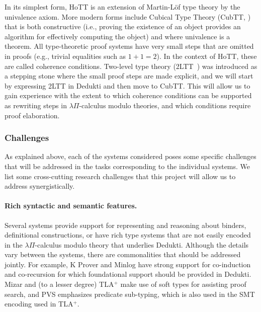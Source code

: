 In its simplest form, HoTT is an extension of Martin-L\"of type theory by the
univalence axiom. More modern forms include Cubical Type Theory (CubTT,
\cite{cohen:cubical}) that is both constructive (i.e., proving the existence of
an object provides an algorithm for effectively computing the object) and where
univalence is a theorem. All type-theoretic proof systems have very small steps
that are omitted in proofs (e.g., trivial equalities such as $1+1=2$). In the
context of HoTT, these are called coherence conditions. Two-level type theory
(2LTT~\cite{annenkov:two-level}) was introduced as a stepping stone where the
small proof steps are made explicit, and we will start by expressing 2LTT in
Dedukti and then move to CubTT. This will allow us to gain experience with
the extent to which coherence conditions can be supported as rewriting steps in
$\lambda\Pi$-calculus modulo theories, and which conditions require proof
elaboration.

\subsubsection*{Challenges}

As explained above, each of the systems considered poses some specific
challenges that will be addressed in the tasks corresponding to the
individual systems. We list some cross-cutting research challenges
that this project will allow us to address synergistically.

\paragraph*{Rich syntactic and semantic features.}
Several systems provide support for representing and reasoning about
binders, definitional constructions, or have rich type systems that
are not easily encoded in the $\lambda\Pi$-calculus modulo theory that
underlies Dedukti.  Although the details vary between the systems,
there are commonalities that should be addressed jointly. For example,
K Prover and Minlog have strong support for co-induction and co-recursion
for which foundational support should be provided in Dedukti. Mizar
and (to a lesser degree) TLA$^+$ make use of soft types for assisting
proof search, and PVS emphasizes predicate sub-typing, which is also
used in the SMT encoding used in TLA$^+$.

